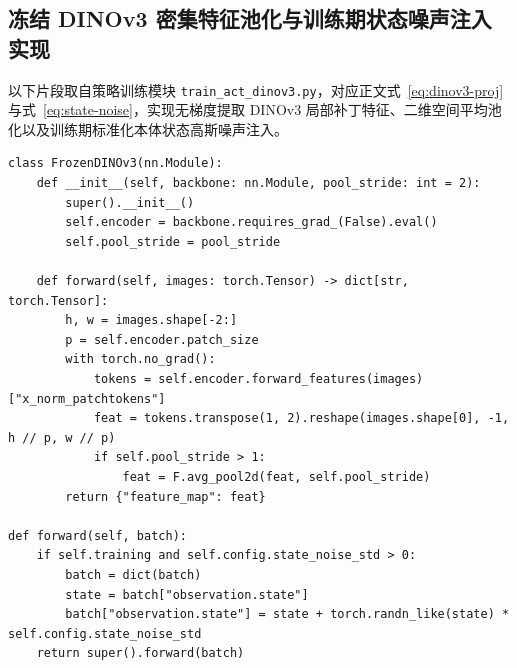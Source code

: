 \subsection{冻结 DINOv3 密集特征池化与训练期状态噪声注入实现}

以下片段取自策略训练模块 \texttt{train\_act\_dinov3.py}，对应正文式~\eqref{eq:dinov3-proj} 与式~\eqref{eq:state-noise}，实现无梯度提取 DINOv3 局部补丁特征、二维空间平均池化以及训练期标准化本体状态高斯噪声注入。

\begin{lstlisting}[caption={冻结 DINOv3 视觉特征提取与标准化状态噪声注入片段}]
class FrozenDINOv3(nn.Module):
    def __init__(self, backbone: nn.Module, pool_stride: int = 2):
        super().__init__()
        self.encoder = backbone.requires_grad_(False).eval()
        self.pool_stride = pool_stride

    def forward(self, images: torch.Tensor) -> dict[str, torch.Tensor]:
        h, w = images.shape[-2:]
        p = self.encoder.patch_size
        with torch.no_grad():
            tokens = self.encoder.forward_features(images)["x_norm_patchtokens"]
            feat = tokens.transpose(1, 2).reshape(images.shape[0], -1, h // p, w // p)
            if self.pool_stride > 1:
                feat = F.avg_pool2d(feat, self.pool_stride)
        return {"feature_map": feat}

def forward(self, batch):
    if self.training and self.config.state_noise_std > 0:
        batch = dict(batch)
        state = batch["observation.state"]
        batch["observation.state"] = state + torch.randn_like(state) * self.config.state_noise_std
    return super().forward(batch)
\end{lstlisting}
